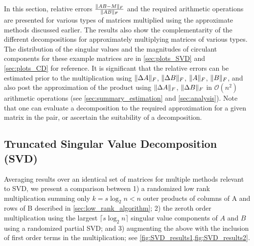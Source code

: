 \documentclass[onefignum,onetabnum]{siamart171218}
\DeclarePairedDelimiter\norm{\lVert}{\rVert}
\begin{document}
In this section, relative errors $\frac{\norm{AB-M}_F}{\norm{AB}_F}$ and the required arithmetic operations are presented for various types of matrices multiplied using the approximate methods discussed earlier. The results also show the complementarity of the different decompositions for approximately multiplying matrices of various types. The distribution of the singular values and the magnitudes of circulant components for these example matrices are in \cref{sec:plots_SVD} and \cref{sec:plots_CD} for reference. It is significant that the relative errors can be estimated prior to the multiplication using $\norm{\Delta A}_F$, $\norm{\Delta B}_F$, $\norm{A}_F$, $\norm{B}_F$, and also post the approximation of the product using $\norm{\Delta A}_F$, $\norm{\Delta B}_F$ in $\mathcal{O}(n^2)$ arithmetic operations (see \cref{sec:summary_estimation} and \cref{sec:analysis}). Note that one can evaluate a decomposition to the required approximation for a given matrix in the pair, or ascertain the suitability of a decomposition.

\subsection{Truncated Singular Value Decomposition (SVD)} \label{sec:results_truncated_SVD}
Averaging results over an identical set of matrices for multiple methods relevant to SVD, we present a comparison between 1) a randomized low rank multiplication summing only $k = s\log_2 n < n$ outer products of columns of A and rows of B \cite{12,matrixmultiply2006Kannan} described in \cref{sec:low_rank_algorithm}; 2) the zeroth order multiplication using the largest $\lceil s \log_2 n \rceil$ singular value components of $A$ and $B$ using a randomized partial SVD; and 3) augmenting the above with the inclusion of first order terms in the multiplication; see \cref{fig:SVD_results1,fig:SVD_results2}.
\end{document}
